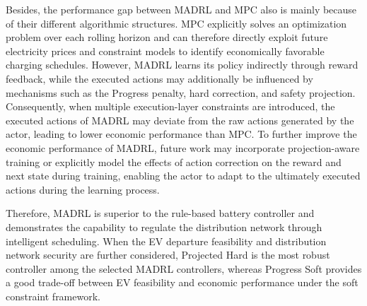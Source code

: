Besides, the performance gap between MADRL and MPC also is mainly because of their different algorithmic structures. MPC explicitly solves an optimization problem over each rolling horizon and can therefore directly exploit future electricity prices and constraint models to identify economically favorable charging schedules. However, MADRL learns its policy indirectly through reward feedback, while the executed actions may additionally be influenced by mechanisms such as the Progress penalty, hard correction, and safety projection. Consequently, when multiple execution-layer constraints are introduced, the executed actions of MADRL may deviate from the raw actions generated by the actor, leading to lower economic performance than MPC. To further improve the economic performance of MADRL, future work may incorporate projection-aware training or explicitly model the effects of action correction on the reward and next state during training, enabling the actor to adapt to the ultimately executed actions during the learning process.

Therefore, MADRL is superior to the rule-based battery controller and demonstrates the capability to regulate the distribution network through intelligent scheduling. When the EV departure feasibility and distribution network security are further considered, Projected Hard is the most robust controller among the selected MADRL controllers, whereas Progress Soft provides a good trade-off between EV feasibility and economic performance under the soft constraint framework.
